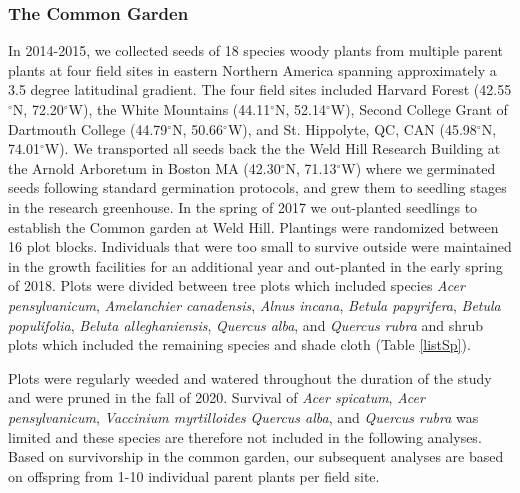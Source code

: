 \documentclass{article}[12pt]
\begin{document}
{\subsubsection{The Common Garden}
In 2014-2015, we collected seeds of 18 species woody plants from multiple parent plants at four field sites in eastern Northern America spanning approximately a 3.5 degree latitudinal gradient. The four field sites included Harvard Forest (42.55$^{\circ}$N, 72.20$^{\circ}$W), the White Mountains (44.11$^{\circ}$N, 52.14$^{\circ}$W), Second College Grant of Dartmouth College (44.79$^{\circ}$N, 50.66$^{\circ}$W), and St. Hippolyte, QC, CAN (45.98$^{\circ}$N, 74.01$^{\circ}$W). We transported all seeds back the the Weld Hill Research Building at the Arnold Arboretum in Boston MA (42.30$^{\circ}$N, 71.13$^{\circ}$W) where we germinated seeds following standard germination protocols, and grew them to seedling stages in the research greenhouse. In the spring of 2017 we out-planted seedlings to establish the Common garden at Weld Hill. Plantings were randomized between 16 plot blocks. Individuals that were too small to survive outside were maintained in the growth facilities for an additional year and out-planted in the early spring of 2018. Plots were divided between tree plots which included species  \textit{Acer pensylvanicum}, \textit{Amelanchier canadensis}, \textit{Alnus incana}, \textit{Betula papyrifera}, \textit{Betula populifolia}, \textit{Beluta alleghaniensis}, \textit{Quercus alba}, and \textit{Quercus rubra} and shrub plots which included the remaining species and shade cloth (Table \ref{listSp}). %

Plots were regularly weeded and watered throughout the duration of the study and were pruned in the fall of 2020. Survival of \textit{Acer spicatum}, \textit{Acer pensylvanicum}, \emph{Vaccinium myrtilloides} \textit{Quercus alba}, and \textit{Quercus rubra} was limited and these species are therefore not included in the following analyses. Based on survivorship in the common garden, our subsequent analyses are based on offspring from 1-10 individual parent plants per field site.

}
\end{document}
